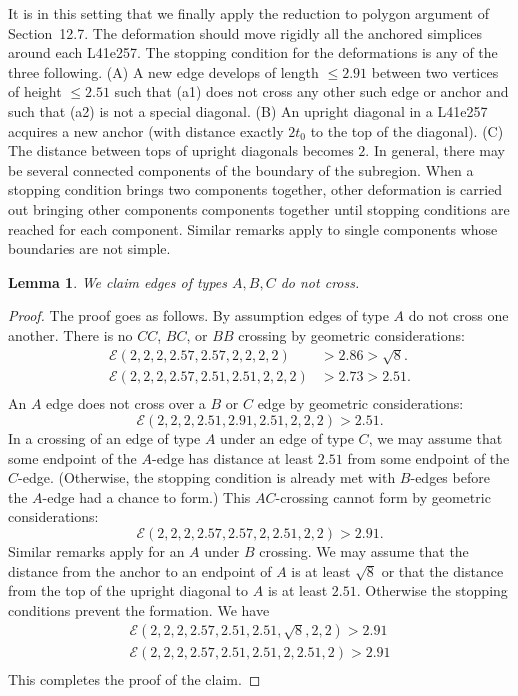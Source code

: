 \documentclass[11pt]{amsart}
\newcommand{\mc}[1]{{\mathcal{#1}}}
\newtheorem{lemma}[subsubsection]{Lemma}
\begin{document}
It is in this setting that we finally apply the reduction to polygon argument of
Section~12.7.  The deformation should move rigidly all the anchored simplices around each L41e257.  
The stopping condition for the deformations is any of the three
following.  (A) A new edge develops of length $\le2.91$ between two vertices
of height $\le 2.51$ such that (a1) does not cross any other such edge or anchor and such that (a2) is not a special diagonal.  (B) An upright diagonal in a L41e257 acquires a new anchor
(with distance exactly $2t_0$ to the top of the diagonal).  (C) The distance
between tops of upright diagonals becomes $2$.  In general, there
may be several connected components of the boundary of the subregion.
When a stopping condition brings two components together, other deformation is carried out bringing other components components together until stopping
conditions are reached for each component.  Similar remarks apply
to single components whose boundaries are not simple.

\begin{lemma}
We claim edges of types $A,B,C$ do not cross.
\end{lemma}

\begin{proof}
The proof goes as follows.
By assumption edges of type $A$ do not cross one another.
There is no $CC$, $BC$, or $BB$ crossing by geometric considerations:
   $$
   \begin{array}{lll}
   \mc{E}(2,2,2,2.57,2.57,2,2,2,2) &> 2.86 > \sqrt8.\\
   \mc{E}(2,2,2,2.57,2.51,2.51,2,2,2) &> 2.73 > 2.51.\\
   \end{array}
   $$
An $A$ edge does not cross over a $B$ or $C$ edge by geometric considerations:
   $$
   \mc{E}(2,2,2,2.51,2.91,2.51,2,2,2) > 2.51.
   $$
In a crossing of an edge of type $A$ under an edge of type $C$, we
may assume that some endpoint of the $A$-edge has distance at least $2.51$
from some endpoint of the $C$-edge.  (Otherwise, the stopping condition
is already met with $B$-edges before the $A$-edge had a chance to form.)
This $AC$-crossing cannot form by geometric considerations:
   $$
   \mc{E}(2,2,2,2.57,2.57,2,2.51,2,2) > 2.91.
   $$
Similar remarks apply for an $A$ under $B$ crossing.  We may assume that
the distance from the anchor to an endpoint of $A$ is at least $\sqrt8$
or that the distance from the top of the upright diagonal to $A$ is
at least $2.51$.  Otherwise the stopping conditions prevent the formation.
We have
   $$
   \begin{array}{lll}
   \mc{E}(2,2,2,2.57,2.51,2.51,\sqrt8,2,2) > 2.91\\
   \mc{E}(2,2,2,2.57,2.51,2.51,2,2.51,2) > 2.91\\
   \end{array}
   $$
This completes the proof of the claim.
\end{proof}
\end{document}
